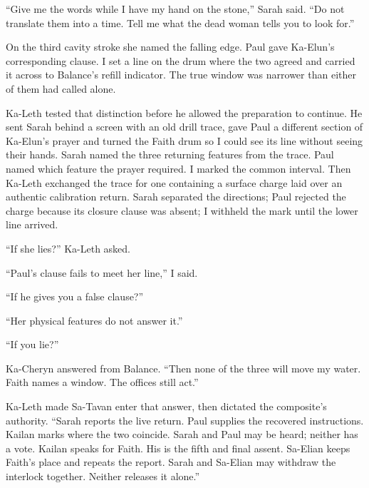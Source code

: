``Give me the words while I have my hand on the stone,'' Sarah said. ``Do not translate them into a time. Tell me what the dead woman tells you to look for.''\par

On the third cavity stroke she named the falling edge. Paul gave Ka-Elun's corresponding clause. I set a line on the drum where the two agreed and carried it across to Balance's refill indicator. The true window was narrower than either of them had called alone.\par

Ka-Leth tested that distinction before he allowed the preparation to continue. He sent Sarah behind a screen with an old drill trace, gave Paul a different section of Ka-Elun's prayer and turned the Faith drum so I could see its line without seeing their hands. Sarah named the three returning features from the trace. Paul named which feature the prayer required. I marked the common interval. Then Ka-Leth exchanged the trace for one containing a surface charge laid over an authentic calibration return. Sarah separated the directions; Paul rejected the charge because its closure clause was absent; I withheld the mark until the lower line arrived.\par

``If she lies?'' Ka-Leth asked.\par

``Paul's clause fails to meet her line,'' I said.\par

``If he gives you a false clause?''\par

``Her physical features do not answer it.''\par

``If you lie?''\par

Ka-Cheryn answered from Balance. ``Then none of the three will move my water. Faith names a window. The offices still act.''\par

Ka-Leth made Sa-Tavan enter that answer, then dictated the composite's authority. ``Sarah reports the live return. Paul supplies the recovered instructions. Kailan marks where the two coincide. Sarah and Paul may be heard; neither has a vote. Kailan speaks for Faith. His is the fifth and final assent. Sa-Elian keeps Faith's place and repeats the report. Sarah and Sa-Elian may withdraw the interlock together. Neither releases it alone.''\par

